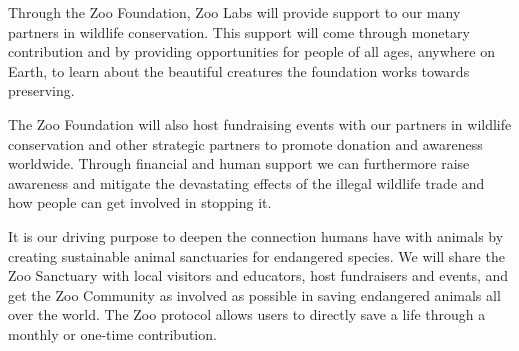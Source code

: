 Through the Zoo Foundation, Zoo Labs will provide support to our many partners in wildlife conservation. This support will come through monetary contribution and by providing opportunities for people of all ages, anywhere on Earth, to learn about the beautiful creatures the foundation works towards preserving.

The Zoo Foundation will also host fundraising events with our partners in wildlife conservation and other strategic partners to promote donation and awareness worldwide. Through financial and human support we can furthermore raise awareness and mitigate the devastating effects of the illegal wildlife trade and how people can get involved in stopping it.

It is our driving purpose to deepen the connection humans have with animals by creating sustainable animal sanctuaries for endangered species. We will share the Zoo Sanctuary with local visitors and educators, host fundraisers and events, and get the Zoo Community as involved as possible in saving endangered animals all over the world. The Zoo protocol allows users to directly save a life through a monthly or one-time contribution.
